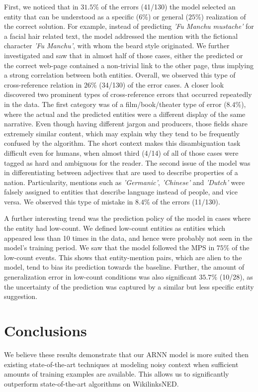 \documentclass[11pt]{article}
\begin{document}
	First, we noticed that in $31.5$\% of the errors (41/130) the model selected an entity that can be understood as a specific ($6$\%) or general ($25$\%) realization of the correct solution. For example, instead of predicting \textit{'Fu Manchu mustache'} for a facial hair related text, the model addressed the mention with the fictional character \textit{'Fu Manchu'}, with whom the beard style originated. We further investigated and saw that in almost half of those cases, either the predicted or the correct web-page contained a non-trivial link to the other page, thus implying a strong correlation between both entities. Overall, we observed this type of cross-reference relation in $26$\% (34/130) of the error cases. A closer look discovered two prominent types of cross-reference errors that occurred repeatedly in the data. The first category was of a film/book/theater type of error ($8.4$\%), where the actual and the predicted entities were a different display of the same narrative. Even though having different jargon and producers, those fields share extremely similar content, which may explain why they tend to be frequently confused by the algorithm. The short context makes this disambiguation task difficult even for humans, when almost third (4/14) of all of those cases were tagged as hard and ambiguous for the reader. The second issue of the model was in differentiating between adjectives that are used to describe properties of a nation. Particularity, mentions such as \textit{'Germanic'}, \textit{'Chinese'} and \textit{'Dutch'} were falsely assigned to entities that describe language instead of people, and vice versa. We observed this type of mistake in $8.4$\% of the errors (11/130).
	
	A further interesting trend was the prediction policy of the model in cases where the entity had low-count. We defined low-count entities as entities which appeared less than 10 times in the data, and hence were probably not seen in the model's training period. We saw that the model followed the MPS in $75$\% of the low-count events. This shows that entity-mention pairs, which are alien to the model, tend to bias its prediction towards the baseline. Further, the amount of generalization error in low-count conditions was also significant $35.7\%$ (10/28), as the uncertainty of the prediction was captured by a similar but less specific entity suggestion.
	
	\section{Conclusions}
	We believe these results demonstrate that our ARNN model is more suited then existing state-of-the-art techniques at modeling noisy context when sufficient amounts of training examples are available. This allows us to significantly outperform state-of-the-art algorithms on WikilinksNED. 
	
\end{document}
